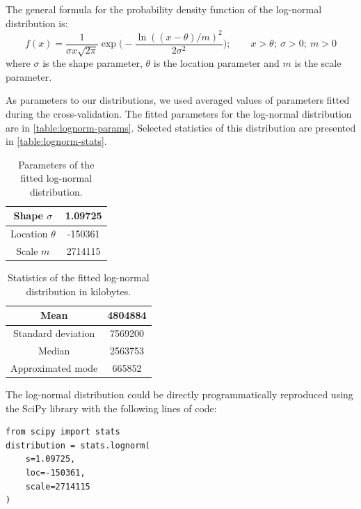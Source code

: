 \documentclass[thesis-en.tex]{subfiles}
\begin{document}
The general formula for the probability density function of the log-normal distribution is:
\[ f(x) = \frac{1}{\sigma x \sqrt{2\pi}} \exp\biggl( -\frac{\ln((x - \theta) / m)^2}{2\sigma^2} \biggr); \qquad x>\theta;\ \sigma>0;\ m>0 \]
where $\sigma$ is the shape parameter, $\theta$ is the location parameter and $m$ is the scale parameter.

As parameters to our distributions, we used averaged values of parameters fitted during the cross-validation. The fitted parameters for the log-normal distribution are in \autoref{table:lognorm-params}. Selected statistics of this distribution are presented in \autoref{table:lognorm-stats}.
\begin{table}[htb]
\centering
\begin{tabular}{ |c|c| } 
  \hline
  Shape $\sigma$ & 1.09725 \\ 
  \hline
  Location $\theta$ & -150361 \\ 
  \hline
  Scale $m$ & 2714115 \\ 
  \hline
\end{tabular}
\caption{Parameters of the fitted log-normal distribution.}
\label{table:lognorm-params}
\end{table}

\begin{table}[htb]
\centering
\begin{tabular}{ |c|c| } 
  \hline
  Mean & 4804884 \\ 
  \hline
  Standard deviation & 7569200 \\ 
  \hline
  Median & 2563753 \\ 
  \hline
  Approximated mode & 665852 \\ 
  \hline
\end{tabular}
\caption{Statistics of the fitted log-normal distribution in kilobytes.}
\label{table:lognorm-stats}
\end{table}

\begin{samepage}
The log-normal distribution could be directly programmatically reproduced using the SciPy library with the following lines of code:
\begin{verbatim}
from scipy import stats
distribution = stats.lognorm(
    s=1.09725, 
    loc=-150361, 
    scale=2714115
)
\end{verbatim}
\end{samepage}
\end{document}
